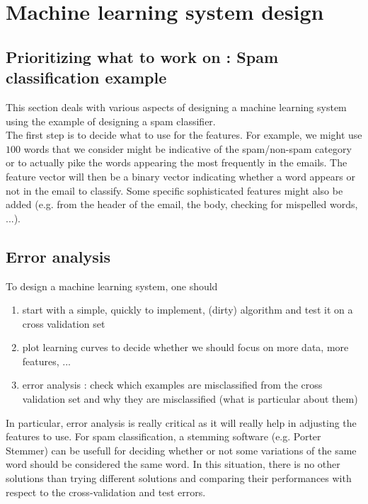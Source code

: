\documentclass[10pt,a4paper]{article}
\begin{document}
\section{Machine learning system design}

\subsection{Prioritizing what to work on : Spam classification example}

This section deals with various aspects of designing a machine
learning system using the example of designing a spam classifier.\\


The first step is to decide what to use for the features. For example,
we might use $100$ words that we consider might be indicative of the
spam/non-spam category or to actually pike the words appearing the
most frequently in the emails. The feature vector will then be a
binary vector indicating whether a word appears or not in the email to
classify. Some specific sophisticated features might also be added
(e.g. from the header of the email, the body, checking for mispelled
words, ...).\\

\subsection{Error analysis}

To design a machine learning system, one should 
\begin{enumerate}
\item start with a simple, quickly to implement, (dirty) algorithm and test it on a cross validation set
\item plot learning curves to decide whether we should focus on more data, more features, ...
\item error analysis : check which examples are misclassified from the cross validation set and why they are misclassified (what is particular about them)
\end{enumerate}

In particular, error analysis is really critical as it will really
help in adjusting the features to use. For spam classification, a
stemming software (e.g. Porter Stemmer) can be usefull for deciding
whether or not some variations of the same word should be considered
the same word. In this situation, there is no other solutions than
trying different solutions and comparing their performances with
respect to the cross-validation and test errors.
\end{document}
